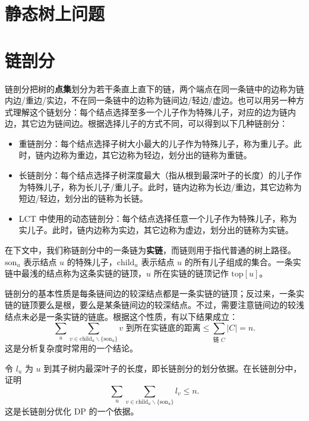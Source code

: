\section{静态树上问题}

\section{链剖分}


链剖分把树的\textbf{点集}划分为若干条直上直下的链，两个端点在同一条链中的边称为链内边/重边/实边，不在同一条链中的边称为链间边/轻边/虚边。也可以用另一种方式理解这个链划分：每个结点选择至多一个儿子作为特殊儿子，对应的边为链内边，其它边为链间边。根据选择儿子的方式不同，可以得到以下几种链剖分：

\begin{itemize}
    \item 重链剖分：每个结点选择子树大小最大的儿子作为特殊儿子，称为重儿子。此时，链内边称为重边，其它边称为轻边，划分出的链称为重链。
    \item 长链剖分：每个结点选择子树深度最大（指从根到最深叶子的长度）的儿子作为特殊儿子，称为长儿子/重儿子。此时，链内边称为长边/重边，其它边称为短边/轻边，划分出的链称为长链。
    \item LCT 中使用的动态链剖分：每个结点选择任意一个儿子作为特殊儿子，称为实儿子。此时，链内边称为实边，其它边称为虚边，划分出的链称为实链。
\end{itemize}

在下文中，我们称链剖分中的一条链为\textbf{实链}，而链则用于指代普通的树上路径。$\mathrm{son}_u$ 表示结点 $u$ 的特殊儿子，$\mathrm{child}_u$ 表示结点 $u$ 的所有儿子组成的集合。一条实链中最浅的结点称为这条实链的链顶，$u$ 所在实链的链顶记作 $\mathrm{top}[u]$。

链剖分的基本性质是每条链间边的较深结点都是一条实链的链顶；反过来，一条实链的链顶要么是根，要么是某条链间边的较深结点。不过，需要注意链间边的较浅结点未必是一条实链的链底。根据这个性质，有以下结果成立：
$$
\sum_{u}\sum_{v\in \mathrm{child}_u\backslash \{\mathrm{son}_u\}} v\text{ 到所在实链底的距离}\le \sum_{\text{链 }C}|C|=n.
$$
这是分析复杂度时常用的一个结论。
\begin{exercise}
    令 $l_u$ 为 $u$ 到其子树内最深叶子的长度，即长链剖分的划分依据。在长链剖分中，证明
    $$
    \sum_{u}\sum_{v\in \mathrm{child}_u\backslash \{\mathrm{son}_u\}} l_v\le n.
    $$
    这是长链剖分优化 DP 的一个依据。
\end{exercise}

